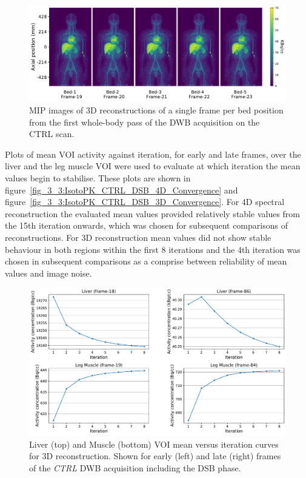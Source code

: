\begin{figure} [h!]
\centering
\includegraphics[scale=0.52,angle=0]{3_Results/3_3_DWB_Reconstruction/figures/3_3_IsotoPK_CTRL_DWB_4D.pdf}
\caption{MIP images of 3D reconstructions of a single frame per bed position from the first whole-body pass of the DWB acquisition on the CTRL scan.}
\label{fig_3_3:IsotoPK_CTRL_DWB_4D}
\end{figure} 

Plots of mean VOI activity against iteration, for early and late frames, over the liver and the leg muscle VOI were used to evaluate at which iteration the mean values begin to stabilise. These plots are shown in figure~\ref{fig_3_3:IsotoPK_CTRL_DSB_4D_Convergence} and figure~\ref{fig_3_3:IsotoPK_CTRL_DSB_3D_Convergence}. For 4D spectral reconstruction the evaluated mean values provided relatively stable values from the 15th iteration onwards, which was chosen for subsequent comparisons of reconstructions. For 3D reconstruction mean values did not show stable behaviour in both regions within the first 8 iterations and the 4th iteration was chosen in subsequent comparisons as a comprise between reliability of mean values and image noise.  

\begin{figure} [h!]
\centering
\includegraphics[scale=0.5,angle=0]{3_Results/3_3_DWB_Reconstruction/figures/3_3_IsotoPK_CTRL_DWB_3D_Convergence.pdf}
\caption{Liver (top) and Muscle (bottom) VOI mean versus iteration curves for 3D reconstruction. Shown for early (left) and late (right) frames of the \textit{CTRL} DWB acquisition including the DSB phase.}
\label{fig_3_3:IsotoPK_CTRL_DWB_4D_Convergence}
\end{figure} 

